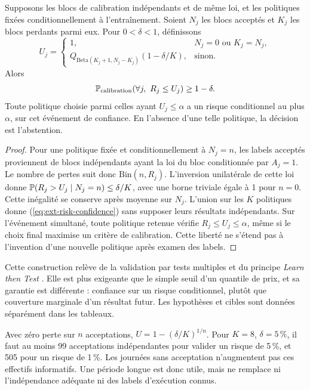 \begin{proposition}
Supposons les blocs de calibration indépendants et de même loi, et les politiques fixées conditionnellement à l'entraînement. Soient \(N_j\) les blocs acceptés et \(K_j\) les blocs perdants parmi eux. Pour \(0<\delta<1\), définissons
\begin{equation}
 U_j=\begin{cases}
 1,&N_j=0\text{ ou }K_j=N_j,\\
 Q_{\mathrm{Beta}(K_j+1,N_j-K_j)}(1-\delta/K),&\text{sinon}.
 \end{cases}
 \label{eq:ext-binomial-upper}
\end{equation}
Alors
\begin{equation}
 \Prob_{\rm calibration}\!\left(\forall j,\ R_j\le U_j\right)\ge1-\delta.
 \label{eq:ext-risk-confidence}
\end{equation}
Toute politique choisie parmi celles ayant \(U_j\le\alpha\) a un risque conditionnel au plus \(\alpha\), sur cet événement de confiance. En l'absence d'une telle politique, la décision est l'abstention.
\end{proposition}
\begin{proof}
Pour une politique fixée et conditionnellement à \(N_j=n\), les labels acceptés proviennent de blocs indépendants ayant la loi du bloc conditionnée par \(A_j=1\). Le nombre de pertes suit donc \(\mathrm{Bin}(n,R_j)\). L'inversion unilatérale de cette loi donne \(\mathbb P(R_j>U_j\mid N_j=n)\le\delta/K\), avec une borne triviale égale à 1 pour \(n=0\). Cette inégalité se conserve après moyenne sur \(N_j\). L'union sur les \(K\) politiques donne (\ref{eq:ext-risk-confidence}) sans supposer leurs résultats indépendants. Sur l'événement simultané, toute politique retenue vérifie \(R_j\le U_j\le\alpha\), même si le choix final maximise un critère de calibration. Cette liberté ne s'étend pas à l'invention d'une nouvelle politique après examen des labels.
\end{proof}

Cette construction relève de la validation par tests multiples et du principe \emph{Learn then Test} \cite{ext-ltt}. Elle est plus exigeante que le simple seuil d'un quantile de prix, et sa garantie est différente : confiance sur un risque conditionnel, plutôt que couverture marginale d'un résultat futur. Les hypothèses et cibles sont données séparément dans les tableaux.

Avec zéro perte sur \(n\) acceptations, \(U=1-(\delta/K)^{1/n}\). Pour \(K=8\), \(\delta=5\,\%\), il faut au moins 99 acceptations indépendantes pour valider un risque de 5\,\%, et 505 pour un risque de 1\,\%. Les journées sans acceptation n'augmentent pas ces effectifs informatifs. Une période longue est donc utile, mais ne remplace ni l'indépendance adéquate ni des labels d'exécution connus.

